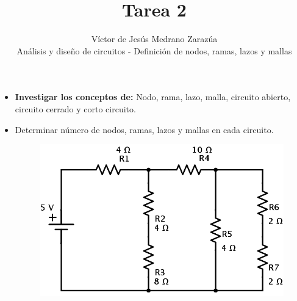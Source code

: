 \documentclass[12pt]{article}
\begin{document}
 
 
 
\title{Tarea 2}%
\author{Víctor de Jesús Medrano Zarazúa\\ %
Análisis y diseño de circuitos - Definición de nodos, ramas, lazos y mallas} %
 
\maketitle

\begin{itemize}
    \item \textbf{Investigar los conceptos de: } Nodo, rama, lazo, malla, circuito abierto, circuito cerrado y corto circuito.

    \item Determinar número de nodos, ramas, lazos y mallas en cada circuito.

    \begin{figure}[h!]
        \centering
        \includegraphics [scale=0.45]{circuit_1}
        \label{fig:circuit1}
    \end{figure}


\end{itemize}
\end{document}
